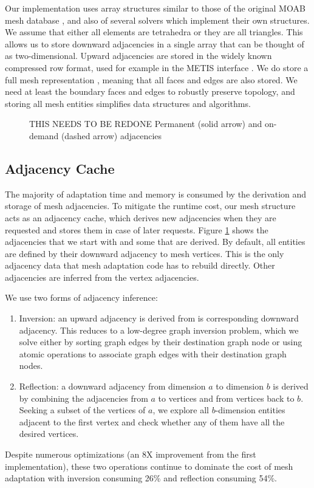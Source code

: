 Our implementation uses array structures similar to those
of the original MOAB mesh database \cite{tautges2004moab},
and also of several solvers which implement their own structures.
We assume that either all elements are tetrahedra or they are all triangles.
This allows us to store downward adjacencies in a single array
that can be thought of as two-dimensional.
Upward adjacencies are stored in the widely known compressed row format,
used for example in the METIS interface \cite{METIS}.
We do store a full mesh representation \cite{beall1997general}, meaning
that all faces and edges are also stored.
We need at least the boundary faces and edges to robustly preserve
topology, and storing all mesh entities simplifies data structures
and algorithms.

\begin{figure}[t]\vspace*{4pt}
\caption{{\color{red} THIS NEEDS TO BE REDONE} Permanent (solid arrow) and on-demand (dashed arrow) adjacencies}\vspace*{-6pt}
\label{fig:adjs}
\end{figure}

\subsection{Adjacency Cache}

The majority of adaptation time and memory is consumed by the
derivation and storage of mesh adjacencies.
To mitigate the runtime cost, our mesh structure acts as an adjacency cache,
which derives new adjacencies when they are requested and stores
them in case of later requests.
Figure \ref{fig:adjs} shows the adjacencies that we start with and some
that are derived.
By default, all entities are defined by their downward adjacency to mesh vertices.
This is the only adjacency data that mesh adaptation code has to rebuild
directly.
Other adjacencies are inferred from the vertex adjacencies.

We use two forms of adjacency inference:
\begin{enumerate}
\item Inversion: an upward adjacency is derived from is corresponding downward
adjacency. This reduces to a low-degree graph inversion problem, which we
solve either by sorting graph edges by their destination graph node or using
atomic operations to associate graph edges with their destination graph nodes.
\item Reflection: a downward adjacency from dimension $a$ to dimension $b$
is derived by combining the adjacencies from $a$ to vertices and from
vertices back to $b$.
Seeking a subset of the vertices of $a$, we explore all $b$-dimension entities
adjacent to the first vertex and check whether any of them have all the
desired vertices.
\end{enumerate}
Despite numerous optimizations (an 8X improvement from the first implementation),
these two operations continue to dominate the cost of mesh adaptation
with inversion consuming 26\% and reflection consuming 54\%.

